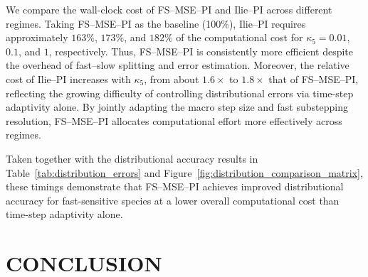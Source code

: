 \documentclass{article}
\begin{document}
We compare the wall-clock cost of FS--MSE--PI and Ilie--PI across different
regimes. Taking FS--MSE--PI as the baseline (100\%), Ilie--PI requires
approximately $163\%$, $173\%$, and $182\%$ of the computational cost for
$\kappa_5 = 0.01$, $0.1$, and $1$, respectively. Thus, FS--MSE--PI is consistently more efficient despite the overhead of
fast--slow splitting and error estimation. Moreover, the relative cost of
Ilie--PI increases with $\kappa_5$, from about $1.6\times$ to $1.8\times$
that of FS--MSE--PI, reflecting the growing difficulty of controlling
distributional errors via time-step adaptivity alone. By jointly adapting
the macro step size and fast substepping resolution, FS--MSE--PI allocates
computational effort more effectively across regimes.

Taken together with the distributional accuracy results in
Table~\ref{tab:distribution_errors} and Figure~\ref{fig:distribution_comparison_matrix},
these timings demonstrate that FS--MSE--PI achieves improved distributional
accuracy for fast-sensitive species at a lower overall computational cost than
time-step adaptivity alone.


\section{CONCLUSION}
\label{sec:conclusion}


\end{document}
